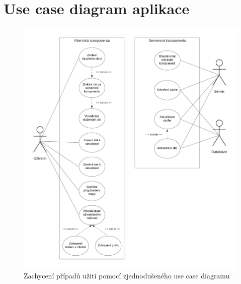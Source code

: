 \chapter{Use case diagram aplikace}

\begin{figure}[h]
	\centering
	\includegraphics[width=1\textwidth]{Pictures/diagram3.pdf}
	\caption{Zachycení případů užití pomocí zjednodušeného use case diagramu}
	\label{fig:Diagram3}
\end{figure}

\endinput